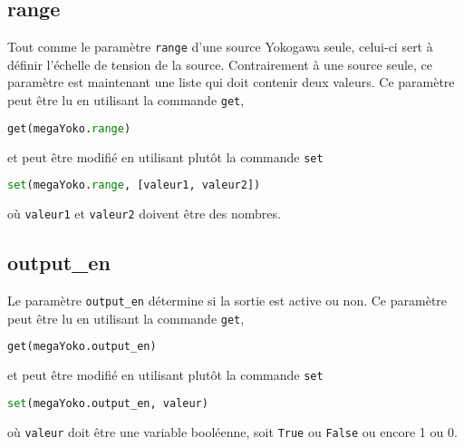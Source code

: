 \documentclass[openright,letterpaper,12pt]{book}
\begin{document}
\subsection*{range}
Tout comme le paramètre \verb+range+ d'une source Yokogawa seule, celui-ci sert 
à définir l'échelle de tension de la source. 
Contrairement à une source seule, ce paramètre est maintenant une liste qui 
doit contenir deux valeurs.
Ce paramètre peut être lu en utilisant la commande \verb+get+,
\begin{lstlisting}[language=Python]
get(megaYoko.range)
\end{lstlisting}
et peut être modifié en utilisant plutôt la commande \verb+set+
\begin{lstlisting}[language=Python]
set(megaYoko.range, [valeur1, valeur2])
\end{lstlisting}
où \verb+valeur1+ et \verb+valeur2+ doivent être des nombres. 

\subsection*{output\_en}
Le paramètre \verb+output_en+ détermine si la sortie est active ou non.
Ce paramètre peut être lu en utilisant la commande \verb+get+,
\begin{lstlisting}[language=Python]
get(megaYoko.output_en)
\end{lstlisting}
et peut être modifié en utilisant plutôt la commande \verb+set+
\begin{lstlisting}[language=Python]
set(megaYoko.output_en, valeur)
\end{lstlisting}
où \verb+valeur+ doit être une variable booléenne, soit \verb+True+ ou 
\verb+False+ ou encore 1 ou 0.
\clearpage\null\thispagestyle{empty}
\end{document}
